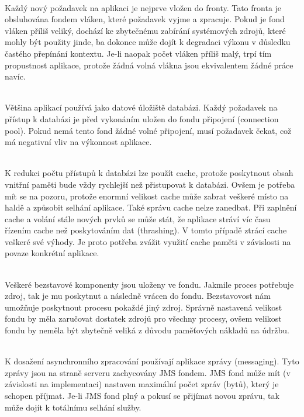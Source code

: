 \documentclass[122pt,oneside]{fithesis}
\begin{document}
\vspace{5 mm}
\\\indent Každý nový požadavek na aplikaci je nejprve vložen do fronty. Tato fronta je obsluhována fondem vláken, které požadavek vyjme a zpracuje. Pokud je fond vláken příliš veliký, dochází ke zbytečnému zabírání systémových zdrojů, které mohly být použity jinde, ba dokonce může dojít k degradaci výkonu v důsledku častého přepínání kontextu. Je-li naopak počet vláken příliš malý, trpí tím propustnost aplikace, protože žádná volná vlákna jsou ekvivalentem žádné práce navíc.

\vspace{5 mm}
\\\indent Většina aplikací používá jako datové úložiště databázi. Každý požadavek na přístup k databázi je před vykonáním uložen do fondu připojení (connection pool). Pokud nemá tento fond žádné volné připojení, musí požadavek čekat, což má negativní vliv na výkonnost aplikace.

\vspace{5 mm}
\\\indent K redukci počtu přístupů k databázi lze použít cache, protože poskytnout obsah vnitřní paměti bude vždy rychlejší než přistupovat k databázi. Ovšem je potřeba mít se na pozoru, protože enormní velikost cache může zabrat veškeré místo na haldě a způsobit selhání aplikace. Také správu cache nelze zanedbat. Při zaplnění cache a volání stále nových prvků se může stát, že aplikace stráví víc času řízením cache než poskytováním dat (thrashing). V tomto případě ztrácí cache veškeré své výhody. Je proto potřeba zvážit využití cache paměti v závislosti na povaze konkrétní aplikace. 

\vspace{5 mm}
\\\indent Veškeré bezstavové komponenty jsou uloženy ve fondu. Jakmile proces potřebuje zdroj, tak je mu poskytnut a následně vrácen do fondu. Bezstavovost nám umožňuje poskytnout procesu pokaždé jiný zdroj. Správně nastavená velikost fondu by měla zaručovat dostatek zdrojů pro všechny procesy, ovšem velikost fondu by neměla být zbytečně veliká z důvodu paměťových nákladů na údržbu.

\vspace{5 mm}
\\\indent K dosažení asynchronního zpracování používají aplikace zprávy (messaging). Tyto zprávy jsou na straně serveru zachycovány JMS fondem. JMS fond může mít (v závislosti na implementaci) nastaven maximální počet zpráv (bytů), který je schopen příjmat. Je-li JMS fond plný a pokusí se přijímat novou zprávu, tak může dojít k totálnímu selhání služby.
\end{document}
